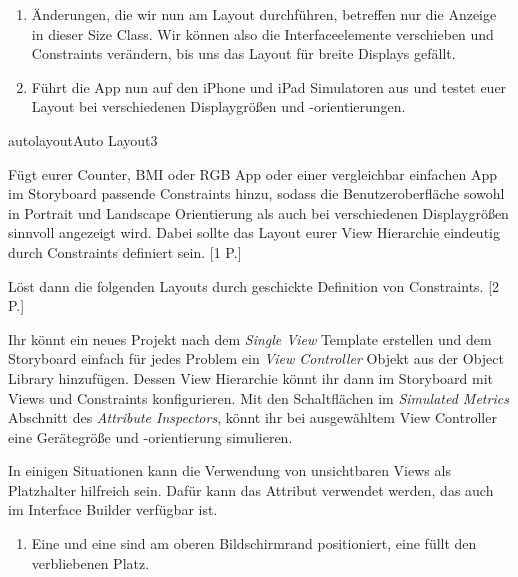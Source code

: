 \documentclass[parskip=half, final]{scrreprt}
\begin{document}
\begin{lecture}
\begin{enumerate}
\item Änderungen, die wir nun am Layout durchführen, betreffen nur die Anzeige in dieser Size Class. Wir können also die Interfaceelemente verschieben und Constraints verändern, bis uns das Layout für breite Displays gefällt.

\item Führt die App nun auf den iPhone und iPad Simulatoren aus und testet euer Layout bei verschiedenen Displaygrößen und -orientierungen.

\end{enumerate}

\begin{exc}

\begin{excitem}{autolayout}{Auto Layout}{3}

Fügt eurer Counter, BMI oder RGB App oder einer vergleichbar einfachen App im Storyboard passende Constraints hinzu, sodass die Benutzeroberfläche sowohl in Portrait und Landscape Orientierung als auch bei verschiedenen Displaygrößen sinnvoll angezeigt wird. Dabei sollte das Layout eurer View Hierarchie eindeutig durch Constraints definiert sein. [1 P.]

Löst dann die folgenden Layouts durch geschickte Definition von Constraints. [2 P.]

\begin{exchinweise}
\item Ihr könnt ein neues Projekt  nach dem \emph{Single View} Template erstellen und dem Storyboard einfach für jedes Problem ein \emph{View Controller} Objekt aus der Object Library hinzufügen. Dessen View Hierarchie könnt ihr dann im Storyboard mit Views und Constraints konfigurieren. Mit den Schaltflächen im \emph{Simulated Metrics} Abschnitt des \emph{Attribute Inspectors}, könnt ihr bei ausgewähltem View Controller eine Gerätegröße und -orientierung simulieren.
\item In einigen Situationen kann die Verwendung von unsichtbaren Views als Platzhalter hilfreich sein. Dafür kann das Attribut  verwendet werden, das auch im Interface Builder verfügbar ist.
\end{exchinweise}

\begin{enumerate}

\item Eine  und eine  sind am oberen Bildschirmrand positioniert, eine  füllt den verbliebenen Platz.


\end{enumerate}
\end{excitem}
\end{exc}
\end{lecture}
\end{document}

